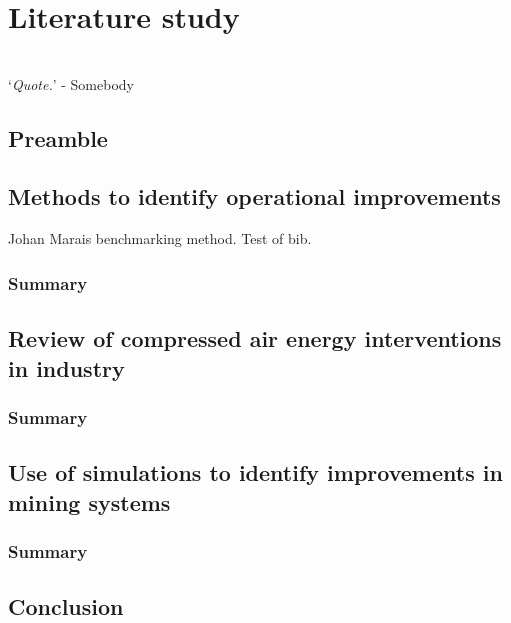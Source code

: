 \chapter{Literature study}
\vspace{38em}

\hrulefill
\\
\enquote*{\textit{Quote.}} - Somebody\\
\newpage
\section{Preamble}
\section{Methods to identify operational improvements}
Johan Marais benchmarking method. Test of bib. 

	\subsection{Summary}
\section{Review of compressed air energy interventions in industry}
	\subsection{Summary}
\section{Use of simulations to identify improvements in mining systems}

	\subsection{Summary}
\section{Conclusion}
